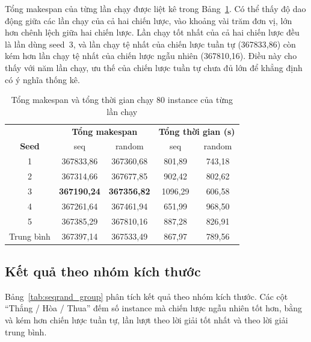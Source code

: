 \documentclass[../DoAn.tex]{subfiles}
\begin{document}
Tổng makespan của từng lần chạy được liệt kê trong Bảng~\ref{tab:runs}. Có thể thấy độ dao động giữa các lần chạy của cả hai chiến lược, vào khoảng vài trăm đơn vị, lớn hơn chênh lệch giữa hai chiến lược. Lần chạy tốt nhất của cả hai chiến lược đều là lần dùng seed~3, và lần chạy tệ nhất của chiến lược tuần tự (367833,86) còn kém hơn lần chạy tệ nhất của chiến lược ngẫu nhiên (367810,16). Điều này cho thấy với năm lần chạy, ưu thế của chiến lược tuần tự chưa đủ lớn để khẳng định có ý nghĩa thống kê.

\begin{table}[H]
\centering
\caption{Tổng makespan và tổng thời gian chạy 80 instance của từng lần chạy}
\label{tab:runs}
\begin{tabular}{c|cc|cc}
\toprule
 & \multicolumn{2}{c|}{\textbf{Tổng makespan}} & \multicolumn{2}{c}{\textbf{Tổng thời gian (s)}} \\
\textbf{Seed} & seq & random & seq & random \\
\midrule
1 & 367833,86 & 367360,68 & 801,89 & 743,18 \\
2 & 367314,66 & 367677,85 & 902,42 & 802,62 \\
3 & \textbf{367190,24} & \textbf{367356,82} & 1096,29 & 606,58 \\
4 & 367261,64 & 367461,94 & 651,99 & 968,50 \\
5 & 367385,29 & 367810,16 & 887,28 & 826,91 \\
\midrule
Trung bình & 367397,14 & 367533,49 & 867,97 & 789,56 \\
\bottomrule
\end{tabular}
\end{table}

\subsection{Kết quả theo nhóm kích thước}

Bảng~\ref{tab:seqrand_group} phân tích kết quả theo nhóm kích thước. Các cột ``Thắng / Hòa / Thua'' đếm số instance mà chiến lược ngẫu nhiên tốt hơn, bằng và kém hơn chiến lược tuần tự, lần lượt theo lời giải tốt nhất và theo lời giải trung bình.
\end{document}
